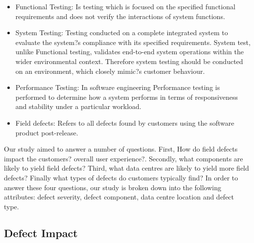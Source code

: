 \documentclass[conference]{IEEEtran}
\begin{document}
\begin{itemize}
 \item Functional Testing: Is testing which is focused on the specified functional requirements and does not verify the interactions of system functions.
 \item System Testing: Testing conducted on a complete integrated system to evaluate the system?s compliance with its specified requirements.  System test, unlike Functional testing, validates end-to-end system operations within the wider environmental context. Therefore system testing should be conducted on an environment, which closely mimic?s customer behaviour.
 \item Performance Testing: In software engineering Performance testing is performed to determine how a system performs in terms of responsiveness and stability under a particular workload.
\item Field defects: Refers to all defects found by customers using the software product post-release.
\end{itemize}

Our study aimed to answer a number of questions. First, How do field defects impact the customers? overall user experience?. Secondly, what components are likely to yield field defects? Third, what data centres are likely to yield more field defects? Finally what types of defects do customers typically find?
In order to answer these four questions, our study is broken down into the following attributes: defect severity, defect component, data centre location and defect type.


\subsection{Defect Impact}
\end{document}
